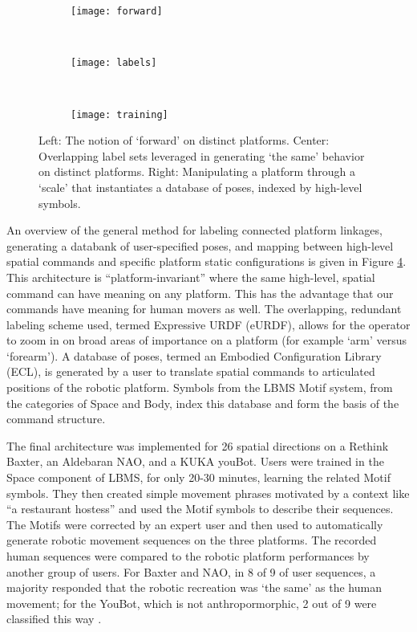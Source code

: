 \documentclass[arts,article,submit,moreauthors,pdftex,10pt,a4paper]{mdpi}
\begin{document}
\begin{figure}[h!]
\centering
\begin{subfigure}[b]{.25\textwidth}
\texttt{[image: forward]}
\label{forward}
\end{subfigure}
~
\begin{subfigure}[b]{.3\textwidth}
\texttt{[image: labels]}
\label{labels}
\end{subfigure}
~
\begin{subfigure}[b]{.37\textwidth}
\texttt{[image: training]}
\label{training}
\end{subfigure}
\vspace{-.1in}
\caption{Left: The notion of `forward' on distinct platforms.  Center: Overlapping label sets leveraged in generating `the same' behavior on distinct platforms.  Right: Manipulating a platform through a `scale' \cite{laban1966choreutics} that instantiates a database of poses, indexed by high-level symbols.}
\label{ecl}
\vspace{-.1in}
\end{figure} 

An overview of the general method for labeling connected platform linkages, generating a databank of user-specified poses, and mapping between high-level spatial commands and specific platform static configurations is given in Figure \ref{ecl}.  This architecture is ``platform-invariant'' where the same high-level, spatial command can have meaning on any platform.  This has the advantage that our commands have meaning for human movers as well.  The overlapping, redundant labeling scheme used, termed Expressive URDF (eURDF), allows for the operator to zoom in on broad areas of importance on a platform (for example `arm' versus `forearm').  A database of poses, termed an Embodied Configuration Library (ECL), is generated by a user to translate spatial commands to articulated positions of the robotic platform.  Symbols from the LBMS Motif system, from the categories of Space and Body, index this database and form the basis of the command structure.

The final architecture was implemented for 26 spatial directions on a Rethink Baxter, an Aldebaran NAO, and a KUKA youBot. Users were trained in the Space component of LBMS, for only 20-30 minutes, learning the related Motif symbols.  They then created simple movement phrases motivated by a context like ``a restaurant hostess'' and used the Motif symbols to describe their sequences.  The Motifs were corrected by an expert user and then used to automatically generate robotic movement sequences on the three platforms.  The recorded human sequences were compared to the robotic platform performances by another group of users.  For Baxter and NAO, in 8 of 9 of user sequences, a majority responded that the robotic recreation was `the same' as the human movement; for the YouBot, which is not anthropormorphic, 2 out of 9 were classified this way \cite{darpaJournal}.  
\end{document}
